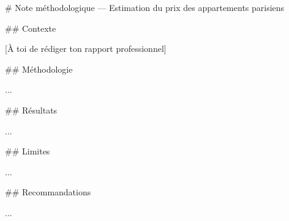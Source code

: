 \documentclass[
  french,
  11pt,
  a4paper,
]{scrbook}
\newenvironment{Shaded}{}{}
\newcommand{\CommentTok}[1]{\textcolor[rgb]{0.42,0.45,0.49}{#1}}
\newcommand{\FunctionTok}[1]{\textcolor[rgb]{0.44,0.26,0.76}{#1}}
\newcommand{\NormalTok}[1]{\textcolor[rgb]{0.14,0.16,0.18}{#1}}
\newcommand{\OtherTok}[1]{\textcolor[rgb]{0.44,0.26,0.76}{#1}}
\begin{document}
\begin{Shaded}
\begin{Highlighting}[]
\FunctionTok{\# Note méthodologique — Estimation du prix des appartements parisiens}

\FunctionTok{\#\# Contexte}

\CommentTok{[}\OtherTok{À toi de rédiger ton rapport professionnel}\CommentTok{]}

\FunctionTok{\#\# Méthodologie}

\NormalTok{...}

\FunctionTok{\#\# Résultats}

\NormalTok{...}

\FunctionTok{\#\# Limites}

\NormalTok{...}

\FunctionTok{\#\# Recommandations}

\NormalTok{...}
\end{Highlighting}
\end{Shaded}
\end{document}
